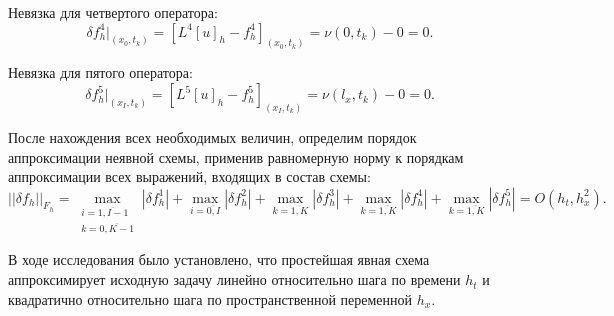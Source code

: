 {{		Невязка для четвертого оператора:
		\begin{equation}
			\delta f^4_h|_{ (x_0, t_k ) } = [L^4[u]_h - f^4_h]_{ (x_0, t_k ) } = \nu(0 , t_k) - 0 = 0\nonumber.
		\end{equation}
		
		Невязка для пятого оператора:
		\begin{equation}
		\delta f^5_h|_{ (x_I, t_k ) } = [L^5[u]_h - f^5_h]_{ (x_I, t_k ) } = \nu(l_x , t_k) - 0 = 0\nonumber.
		\end{equation}
		
		После нахождения всех необходимых величин, определим порядок аппроксимации неявной схемы, применив равномерную норму к порядкам аппроксимации всех выражений, входящих в состав схемы:
		\begin{equation}
			|| \delta f_h ||_{F_h} = \max_{\substack{i = \overline{1, I-1} \\ k = \overline{0, K-1}}} | \delta f^1_h| + \max_{i = \overline{0, I}} | \delta f^2_h| + \max_{k = \overline{1, K}} | \delta f^3_h| +  \max_{k = \overline{1, K}} | \delta f^4_h| +  \max_{k = \overline{1, K}} | \delta f^5_h| = O(h_t, h^2_x).
		\end{equation}
		
		В ходе исследования было установлено, что простейшая явная схема аппроксимирует исходную задачу линейно относительно шага по времени $h_t$ и квадратично относительно шага по пространственной переменной $h_x$. 
		
}}
